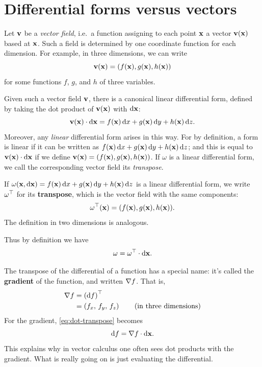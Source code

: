 \documentclass[12pt]{amsart}
\begin{document}
\section{Differential forms versus vectors}
\label{sec:forms-vs-vectors}

Let $\mathbf{v}$ be a \emph{vector field}, i.e.\ a function assigning to each point $\mathbf{x}$ a vector $\mathbf{v}(\mathbf{x})$ based at $\mathbf{x}$.
Such a field is determined by one coordinate function for each dimension.
For example, in three dimensions, we can write
\[ \mathbf{v}(\mathbf{x}) = (f(\mathbf{x}),g(\mathbf{x}),h(\mathbf{x})) \]
for some functions $f$, $g$, and $h$ of three variables.

Given such a vector field $\mathbf{v}$, there is a canonical linear differential form, defined by taking the dot product of $\mathbf{v}(\mathbf{x})$ with ${\mathrm{d} \mathbf{x}}$:
\[ \mathbf{v}(\mathbf{x}) \cdot {\ensuremath{\mathrm{d} \mathbf{x}}} = f(\mathbf{x})\,{\mathrm{d} x} + g(\mathbf{x})\,{\mathrm{d} y} + h(\mathbf{x})\,{\mathrm{d} z}. \]
Moreover, any \emph{linear} differential form arises in this way.
For by definition, a form is linear if it can be written as $f(\mathbf{x})\,{\mathrm{d} x} + g(\mathbf{x})\,{\mathrm{d} y} + h(\mathbf{x})\,{\mathrm{d} z}$; and this is equal to $\mathbf{v}(\mathbf{x}) \cdot {\ensuremath{\mathrm{d} \mathbf{x}}}$ if we define $\mathbf{v}(\mathbf{x}) = (f(\mathbf{x}),g(\mathbf{x}),h(\mathbf{x}))$.
If $\omega$ is a linear differential form, we call the corresponding vector field its \emph{transpose}.

\begin{defn}
  If $\omega(\mathbf{x},{\mathrm{d} \mathbf{x}}) = f(\mathbf{x})\,{\mathrm{d} x} + g(\mathbf{x})\,{\mathrm{d} y} + h(\mathbf{x})\,{\mathrm{d} z}$ is a linear differential form, we write ${\omega}^\top$ for its \textbf{transpose}, which is the vector field with the same components:
  \[ {\omega}^\top(\mathbf{x}) = (f(\mathbf{x}), g(\mathbf{x}), h(\mathbf{x})). \]
  The definition in two dimensions is analogous.
\end{defn}

Thus by definition we have
\begin{equation}\label{eq:dot-transpose}
  \omega = {\omega}^\top \cdot {\ensuremath{\mathrm{d} \mathbf{x}}}.
\end{equation}

The transpose of the differential of a function has a special name: it's called the \textbf{gradient} of the function, and written $\nabla f$.
That is,
\begin{align*}
  \nabla f &= {({\mathrm{d} f})}^\top\\
  &= \left({f}_{x},\,{f}_{y},\,{f}_{z}\right) \qquad\text{(in three dimensions)}
\end{align*}
For the gradient, \cref{eq:dot-transpose} becomes
\[ {\mathrm{d} f} = \nabla f \cdot {\ensuremath{\mathrm{d} \mathbf{x}}}. \]
This explains why in vector calculus one often sees dot products with the gradient.
What is really going on is just evaluating the differential.
\end{document}
